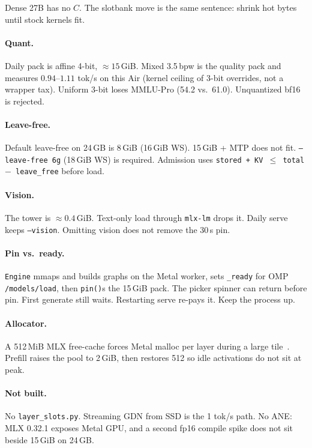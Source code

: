 Dense 27B has no $C$. The slotbank move is the same sentence: shrink hot bytes until stock kernels fit.

\paragraph{Quant.} Daily pack is affine 4-bit, $\approx 15$\,GiB. Mixed 3.5\,bpw is the quality pack and measures $0.94$--$1.11$ tok/s on this Air (kernel ceiling of 3-bit overrides, not a wrapper tax). Uniform 3-bit loses MMLU-Pro (54.2 vs.\ 61.0). Unquantized bf16 is rejected.

\paragraph{Leave-free.} Default leave-free on 24\,GB is 8\,GiB (16\,GiB WS). 15\,GiB + MTP does not fit. \texttt{--leave-free 6g} (18\,GiB WS) is required. Admission uses \texttt{stored + KV $\le$ total $-$ leave\_free} before load.

\paragraph{Vision.} The tower is $\approx 0.4$\,GiB. Text-only load through \texttt{mlx-lm} drops it. Daily serve keeps \texttt{--vision}. Omitting vision does not remove the 30\,s pin.

\paragraph{Pin vs.\ ready.} \texttt{Engine} mmaps and builds graphs on the Metal worker, sets \texttt{\_ready} for OMP \texttt{/models/load}, then \texttt{pin()}s the 15\,GiB pack. The picker spinner can return before pin. First generate still waits. Restarting serve re-pays it. Keep the process up.

\paragraph{Allocator.} A 512\,MiB MLX free-cache forces Metal malloc per layer during a large tile~\citep{mlx3350}. Prefill raises the pool to 2\,GiB, then restores 512 so idle activations do not sit at peak.

\paragraph{Not built.} No \texttt{layer\_slots.py}. Streaming GDN from SSD is the 1 tok/s path. No ANE: MLX 0.32.1 exposes Metal GPU, and a second fp16 compile spike does not sit beside 15\,GiB on 24\,GB.

